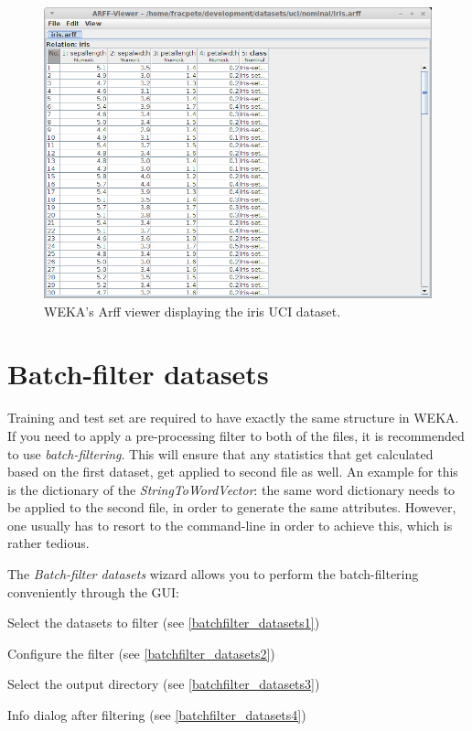 \begin{figure}[htb]
  \centering
  \includegraphics[width=12.0cm]{images/arffviewer.png}
  \caption{WEKA's Arff viewer displaying the iris UCI dataset.}
  \label{arffviewer}
\end{figure}

\clearpage
\section{Batch-filter datasets}

Training and test set are required to have exactly the same structure
in WEKA. If you need to apply a pre-processing filter to both of the
files, it is recommended to use \textit{batch-filtering}. This will
ensure that any statistics that get calculated based on the first
dataset, get applied to second file as well. An example for this is
the dictionary of the \textit{StringToWordVector}: the same word
dictionary needs to be applied to the second file, in order to generate
the same attributes. However, one usually has to resort to the command-line
in order to achieve this, which is rather tedious.

The \textit{Batch-filter datasets} wizard allows you to perform the
batch-filtering conveniently through the GUI:
\begin{tight_itemize}
  \item Select the datasets to filter (see \ref{batchfilter_datasets1})
  \item Configure the filter (see \ref{batchfilter_datasets2})
  \item Select the output directory (see \ref{batchfilter_datasets3})
  \item Info dialog after filtering (see \ref{batchfilter_datasets4})
\end{tight_itemize}

